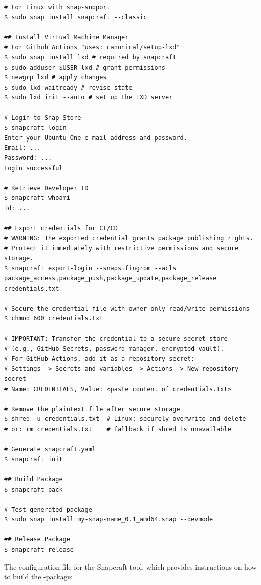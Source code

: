 \begin{lstlisting}[language=terminal]
# For Linux with snap-support
$ sudo snap install snapcraft --classic 

## Install Virtual Machine Manager
# For Github Actions "uses: canonical/setup-lxd"
$ sudo snap install lxd # required by snapcraft
$ sudo adduser $USER lxd # grant permissions
$ newgrp lxd # apply changes
$ sudo lxd waitready # revise state
$ sudo lxd init --auto # set up the LXD server

# Login to Snap Store
$ snapcraft login
Enter your Ubuntu One e-mail address and password.
Email: ...
Password: ...
Login successful 

# Retrieve Developer ID
$ snapcraft whoami
id: ...

## Export credentials for CI/CD
# WARNING: The exported credential grants package publishing rights.
# Protect it immediately with restrictive permissions and secure storage.
$ snapcraft export-login --snaps=fingrom --acls package_access,package_push,package_update,package_release credentials.txt

# Secure the credential file with owner-only read/write permissions
$ chmod 600 credentials.txt

# IMPORTANT: Transfer the credential to a secure secret store
# (e.g., GitHub Secrets, password manager, encrypted vault).
# For GitHub Actions, add it as a repository secret:
# Settings -> Secrets and variables -> Actions -> New repository secret
# Name: CREDENTIALS, Value: <paste content of credentials.txt>

# Remove the plaintext file after secure storage
$ shred -u credentials.txt  # Linux: securely overwrite and delete
# or: rm credentials.txt    # fallback if shred is unavailable

# Generate snapcraft.yaml
$ snapcraft init

## Build Package
$ snapcraft pack

# Test generated package
$ sudo snap install my-snap-name_0.1_amd64.snap --devmode

## Release Package
$ snapcraft release
\end{lstlisting}

\noindent The configuration file for the Snapcraft tool, which provides instructions on how to build the -package:

